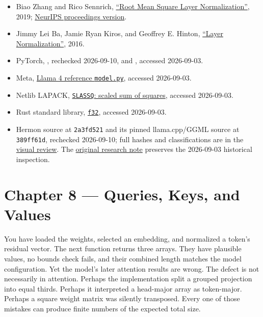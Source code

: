 \documentclass[
  10pt,
]{article}
\providecommand{\tightlist}{%
  \setlength{\itemsep}{0pt}\setlength{\parskip}{0pt}}
\begin{document}
\begin{itemize}
\tightlist
\item
  Biao Zhang and Rico Sennrich,
  \href{https://arxiv.org/abs/1910.07467}{``Root Mean Square Layer
  Normalization''}, 2019;
  \href{https://papers.neurips.cc/paper_files/paper/2019/file/1e8a19426224ca89e83cef47f1e7f53b-Paper.pdf}{NeurIPS
  proceedings version}.
\item
  Jimmy Lei Ba, Jamie Ryan Kiros, and Geoffrey E. Hinton,
  \href{https://arxiv.org/abs/1607.06450}{``Layer Normalization''},
  2016.
\item
  PyTorch,
  \href{https://docs.pytorch.org/docs/2.14/generated/torch.nn.RMSNorm.html}{\texttt{}},
  rechecked 2026-09-10, and
  \href{https://docs.pytorch.org/docs/stable/generated/torch.nn.Embedding.html}{\texttt{}},
  accessed 2026-09-03.
\item
  Meta,
  \href{https://github.com/meta-llama/llama-models/blob/main/models/llama4/model.py}{Llama
  4 reference \texttt{model.py}}, accessed 2026-09-03.
\item
  Netlib LAPACK,
  \href{https://www.netlib.org/lapack/explore-html/d8/d76/group__lassq_ga0596b4bfa745d0d1c5817d4790921cda.html}{\texttt{SLASSQ}:
  scaled sum of squares}, accessed 2026-09-03.
\item
  Rust standard library,
  \href{https://doc.rust-lang.org/std/primitive.f32.html}{\texttt{f32}},
  accessed 2026-09-03.
\item
  Hermon source at \texttt{2a3fd521} and its pinned llama.cpp/GGML
  source at \texttt{389ff61d}, rechecked 2026-09-10; full hashes and
  classifications are in the
  \href{https://github.com/hermonai/inside-the-llm-engine/blob/astra-visual-rewrite/research/astra/chapter07-regeneration.md}{visual
  review}. The
  \href{https://github.com/hermonai/inside-the-llm-engine/blob/astra-visual-rewrite/research/part-02/chapter-07-embeddings-and-normalization.md}{original
  research note} preserves the 2026-09-03 historical inspection.
\end{itemize}

\clearpage

\section{Chapter 8 --- Queries, Keys, and
Values}\label{chapter-8-queries-keys-and-values}

You have loaded the weights, selected an embedding, and normalized a
token's residual vector. The next function returns three arrays. They
have plausible values, no bounds check fails, and their combined length
matches the model configuration. Yet the model's later attention results
are wrong. The defect is not necessarily in attention. Perhaps the
implementation split a grouped projection into equal thirds. Perhaps it
interpreted a head-major array as token-major. Perhaps a square weight
matrix was silently transposed. Every one of those mistakes can produce
finite numbers of the expected total size.
\end{document}
